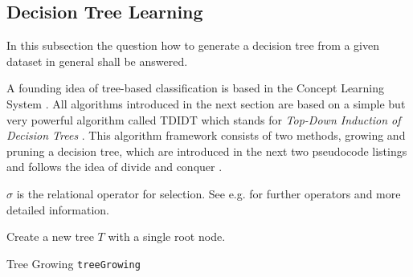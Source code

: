 \newpage

\subsection{Decision Tree Learning}

In this subsection the question how to generate a decision tree from a given dataset in general shall be answered.

A founding idea of tree-based classification is based in the Concept Learning System \cite{quinlan1986induction}.
All algorithms introduced in the next section are based on a simple but very powerful algorithm called TDIDT which stands for \textit{Top-Down Induction of Decision Trees} \cite{quinlan1986induction}. This algorithm framework consists of two methods, growing and pruning a decision tree, which are introduced in the next two pseudocode listings and follows the idea of divide and conquer \cite[p. 33]{cormen2001introduction}. 

\begin{remark}
    $\sigma$ is the relational operator for selection. See e.g. \cite[p. 145]{rob2008database} for further operators and more detailed information. 
\end{remark}

 
\begin{algorithm}
\BlankLine
Create a new tree $T$ with a single root node.\\
\caption{Tree Growing \texttt{treeGrowing}}
\end{algorithm}

